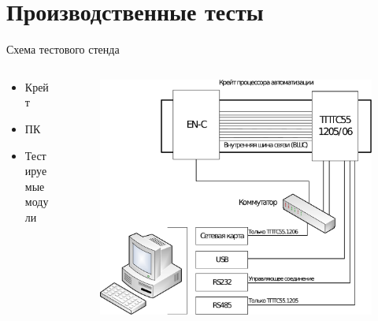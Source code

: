 \documentclass[unicode, notheorems]{beamer}
\begin{document}
\section{Производственные тесты}
\begin{frame}{Схема тестового стенда}
\begin{columns}[c]

\begin{column}{0.4\linewidth}
\begin{itemize}
 \item Крейт
 \item ПК
 \item Тестируемые модули
\end{itemize}

\end{column}
\begin{column}{0.75\linewidth}
\begin{figure}[h]
\begin{center}
	\includegraphics[width=1.0\columnwidth]{test-stend}
\end{center}
\end{figure}
\end{column}
\end{columns}
\end{frame}
\end{document}
